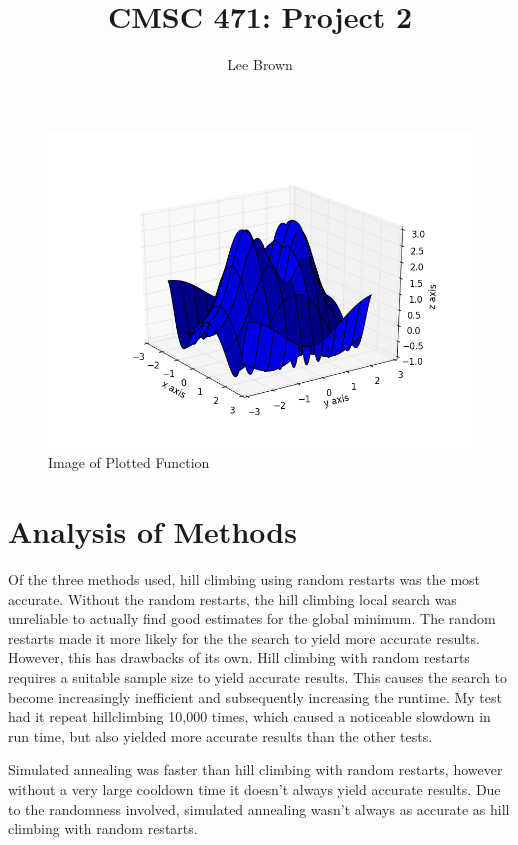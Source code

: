 \documentclass{article}
\begin{document}
\title{CMSC 471: Project 2}
\author{Lee Brown}

\maketitle

\begin{figure}[h!]
  \centering
  \includegraphics[scale=.5]{figure1.png}
  \caption{Image of Plotted Function}
\end{figure}

\section{Analysis of Methods}
Of the three methods used, hill climbing using random restarts was the most accurate. Without the random restarts, the hill climbing local search was unreliable to actually find good estimates for the global minimum. The random restarts made it more likely for the the search to yield more accurate results. However, this has drawbacks of its own. Hill climbing with random restarts requires a suitable sample size to yield accurate results. This causes the search to become increasingly inefficient and subsequently increasing the runtime. My test had it repeat hillclimbing 10,000 times, which caused a noticeable slowdown in run time, but also yielded more accurate results than the other tests.  

Simulated annealing was faster than hill climbing with random restarts, however without a very large cooldown time it doesn’t always yield accurate results. Due to the randomness involved, simulated annealing wasn’t always as accurate as hill climbing with random restarts.
\end{document}
